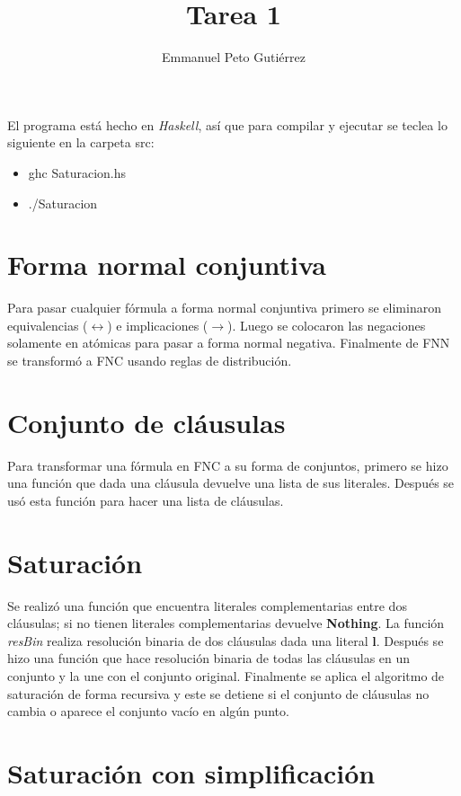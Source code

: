 \documentclass{article}
\author{Emmanuel Peto Gutiérrez}
\title{Tarea 1}
\begin{document}
\maketitle

El programa está hecho en \textit{Haskell}, así que para compilar y ejecutar se teclea lo siguiente en la carpeta src:

\begin{itemize}
\item ghc Saturacion.hs
\item ./Saturacion
\end{itemize}

\section{Forma normal conjuntiva}

Para pasar cualquier fórmula a forma normal conjuntiva primero se eliminaron equivalencias ($\leftrightarrow$) e implicaciones ($\rightarrow$). Luego se colocaron las negaciones solamente en atómicas para pasar a forma normal negativa. Finalmente de FNN se transformó a FNC usando reglas de distribución.

\section{Conjunto de cláusulas}

Para transformar una fórmula en FNC a su forma de conjuntos, primero se hizo una función que dada una cláusula devuelve una lista de sus literales. Después se usó esta función para hacer una lista de cláusulas.

\section{Saturación}

Se realizó una función que encuentra literales complementarias entre dos cláusulas; si no tienen literales complementarias devuelve \textbf{Nothing}. La función \textit{resBin} realiza resolución binaria de dos cláusulas dada una literal \textbf{l}. Después se hizo una función que hace resolución binaria de todas las cláusulas en un conjunto y la une con el conjunto original. Finalmente se aplica el algoritmo de saturación de forma recursiva y este se detiene si el conjunto de cláusulas no cambia o aparece el conjunto vacío en algún punto.

\section{Saturación con simplificación}
\end{document}
